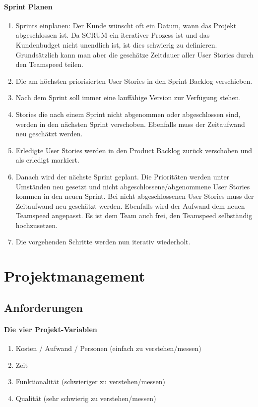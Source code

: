 \paragraph{Sprint Planen}
\begin{enumerate}
	\item Sprints einplanen: Der Kunde wünscht oft ein Datum, wann das Projekt abgeschlossen ist. Da SCRUM ein iterativer Prozess ist und das Kundenbudget nicht unendlich ist, ist dies schwierig zu definieren. Grundsätzlich kann man aber die geschätze Zeitdauer aller User Stories durch den Teamspeed teilen. 
	\item Die am höchsten priorisierten User Stories in den Sprint Backlog verschieben.
	\item Nach dem Sprint soll immer eine lauffähige Version zur Verfügung stehen.
	\item Stories die nach einem Sprint nicht abgenommen oder abgeschlossen sind, werden in den nächsten Sprint verschoben. Ebenfalls muss der Zeitaufwand neu geschätzt werden.
	\item Erledigte User Stories werden in den Product Backlog zurück verschoben und als erledigt markiert.
	\item Danach wird der nächste Sprint geplant. Die Prioritäten werden unter Umständen neu gesetzt und nicht abgeschlossene/abgenommene User Stories kommen in den neuen Sprint. Bei nicht abgeschlossenen User Stories muss der Zeitaufwand neu geschätzt werden. Ebenfalls wird der Aufwand dem neuen Teamspeed angepasst. Es ist dem Team auch frei, den Teamspeed selbständig hochzusetzen.
	\item Die vorgehenden Schritte werden nun iterativ wiederholt.
\end{enumerate}


\section{Projektmanagement}
\subsection{Anforderungen}
\paragraph{Die vier Projekt-Variablen} \hfill
\begin{enumerate}
	\item Kosten / Aufwand / Personen (einfach zu verstehen/messen)
	\item Zeit 
	\item Funktionalität (schwieriger zu verstehen/messen)
	\item Qualität (sehr schwierig zu verstehen/messen)
\end{enumerate}

